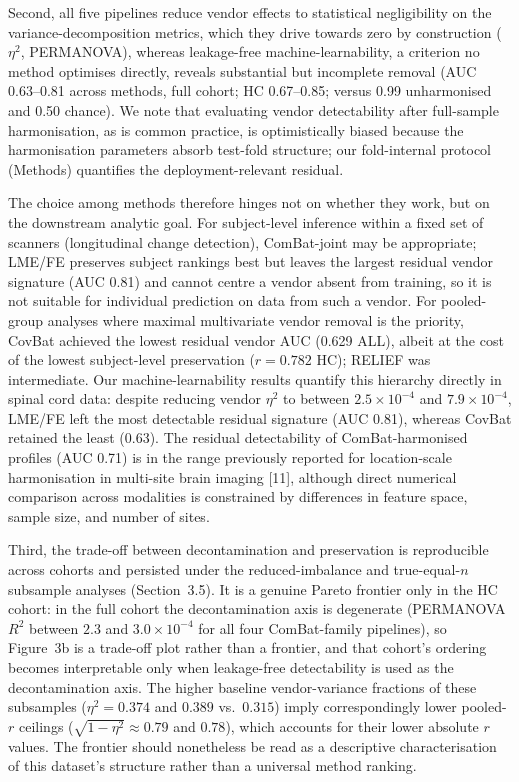 \documentclass[12pt,a4paper]{article}
\begin{document}
Second, all five pipelines reduce vendor effects to statistical negligibility on the variance-decomposition metrics, which they drive towards zero by construction ($\eta^2$, PERMANOVA), whereas leakage-free machine-learnability, a criterion no method optimises directly, reveals substantial but incomplete removal (AUC 0.63--0.81 across methods, full cohort; HC 0.67--0.85; versus 0.99 unharmonised and 0.50 chance). We note that evaluating vendor detectability after full-sample harmonisation, as is common practice, is optimistically biased because the harmonisation parameters absorb test-fold structure; our fold-internal protocol (Methods) quantifies the deployment-relevant residual.

The choice among methods therefore hinges not on whether they work, but on the downstream analytic goal. For subject-level inference within a fixed set of scanners (longitudinal change detection), ComBat-joint may be appropriate; LME/FE preserves subject rankings best but leaves the largest residual vendor signature (AUC 0.81) and cannot centre a vendor absent from training, so it is not suitable for individual prediction on data from such a vendor. For pooled-group analyses where maximal multivariate vendor removal is the priority, CovBat achieved the lowest residual vendor AUC (0.629 ALL), albeit at the cost of the lowest subject-level preservation ($r=0.782$ HC); RELIEF was intermediate. Our machine-learnability results quantify this hierarchy directly in spinal cord data: despite reducing vendor $\eta^2$ to between $2.5\times10^{-4}$ and $7.9\times10^{-4}$, LME/FE left the most detectable residual signature (AUC 0.81), whereas CovBat retained the least (0.63). The residual detectability of ComBat-harmonised profiles (AUC 0.71) is in the range previously reported for location-scale harmonisation in multi-site brain imaging [11], although direct numerical comparison across modalities is constrained by differences in feature space, sample size, and number of sites.

Third, the trade-off between decontamination and preservation is reproducible across cohorts and persisted under the reduced-imbalance and true-equal-$n$ subsample analyses (Section~3.5). It is a genuine Pareto frontier only in the HC cohort: in the full cohort the decontamination axis is degenerate (PERMANOVA $R^2$ between $2.3$ and $3.0\times10^{-4}$ for all four ComBat-family pipelines), so Figure~3b is a trade-off plot rather than a frontier, and that cohort's ordering becomes interpretable only when leakage-free detectability is used as the decontamination axis. The higher baseline vendor-variance fractions of these subsamples ($\eta^2=0.374$ and $0.389$ vs.\ $0.315$) imply correspondingly lower pooled-$r$ ceilings ($\sqrt{1-\eta^2}\approx0.79$ and $0.78$), which accounts for their lower absolute $r$ values. The frontier should nonetheless be read as a descriptive characterisation of this dataset's structure rather than a universal method ranking.
\end{document}
